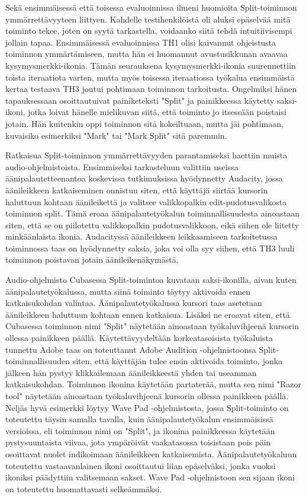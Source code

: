 \documentclass[utf8]{gradu3}
\begin{document}
Sekä ensimmäisessä että toisessa evaluoinnissa ilmeni huomioita Split-toiminnon ymmärrettävyyteen liittyen. Kahdelle testihenkilöistä oli aluksi epäselvää mitä toiminto tekee, joten on syytä tarkastella, voidaanko siitä tehdä intuitiivisempi jollain tapaa. Ensimmäisessä evaluoinnissa TH1 olisi kaivannut ohjeistusta toiminnon ymmärtämiseen, mutta hän ei huomannut avustusikkunan avaavaa kysymysmerkki-ikonia. Tämän seurauksena kysymysmerkki-ikonia suurennettiin toista iteraatiota varten, mutta myös toisessa iteraatiossa työkalua ensimmäistä kertaa testaava TH3 joutui pohtimaan toiminnon tarkoitusta. Ongelmiksi hänen tapauksessaan osoittautuivat  painiketeksti "Split" ja painikkeessa käytetty saksi-ikoni, jotka loivat hänelle mielikuvan siitä, että toiminto jo itsessään poistaisi jotain. Hän kuitenkin oppi toiminnon sitä kokeiltuaan, mutta jäi pohtimaan, kuvaisiko esimerkiksi "Mark" tai "Mark Split" sitä paremmin.

Ratkaisua Split-toiminnon ymmärrettävyyden parantamiseksi haettiin muista audio-ohjelmistoista. Ensimmiseksi tarkasteluun valittiin useissa äänipalautetteenantoa koskevissa tutkimuksissa hyödynnetty Audacity, jossa äänileikkeen katkaiseminen onnistuu siten, että käyttäjä siirtää kursorin haluttuun kohtaan äänileikettä ja valitsee valikkopalkin edit-pudotusvalikosta toiminnon split. Tämä eroaa äänipalautetyökalun toiminnallisuudesta ainoastaan siten, että se on piilotettu valikkopalkin pudotusvalikkoon, eikä siihen ole liitetty minkäänlaista ikonia. Audacityssä äänileikkeen leikkaamiseen tarkoitetussa toiminnossa taas on hyödynnetty saksia, joka voi olla syy siihen, että TH3 luuli toiminnon poistavan jotain äänileikenäkymästä.  

Audio-ohjelmisto Cubasessa Split-toimintoa kuvataan saksi-ikonilla, aivan kuten äänipalautetyökalussa, mutta siinä toiminto täytyy aktivoida ennen katkaisukohdan valintaa. Äänipalautetyökalussa kursori taas asetetaan äänileikkeen haluttuun kohtaan ennen katkaisua. Lisäksi ne eroavat siten, että Cubasessa toiminnon nimi "Split" näytetään ainoastaan työkaluvihjeenä kursorin ollessa painikkeen päällä. Käytettävyydeltään korkeatasoisista työkaluista tunnettu Adobe taas on toteuttanut Adobe Audition -ohjelmistoonsa Split-toiminnallisuuden siten, että käyttäjän tulee ensin aktivoida toiminto, jonka jälkeen hän pystyy klikkailemaan äänileikkeestä yhden tai useamman katkaisukohdan. Toiminnon ikonina käytetään partaterää, mutta sen nimi "Razor tool" näytetään ainoastaan työkaluvihjeenä kursorin ollessa painikkeen päällä. Neljäs hyvä esimerkki löytyy Wave Pad -ohjelmistosta, jossa Split-toiminto on toteutettu täysin samalla tavalla, kuin äänipalautetyökalun ensimmäisissä versioissa, eli toiminnon nimi on "Split", ja ikonina painikkeessa käytetään pystysuuntaista viivaa, jota ympäröivät vaakatasossa toisistaan pois päin osoittavat nuolet indikoimaan äänileikkeen katkaisemista. Äänipalautetyökaluun toteutettu vastaavanlainen ikoni osoittautui liian epäselväksi, jonka vuoksi ikoniksi päädyttiin valitsemaan sakset. Wave Pad -ohjelmistoon sen sijaan ikoni on toteutettu huomattavasti selkeämmäksi. 
\end{document}
